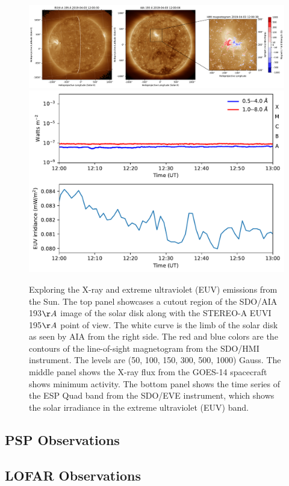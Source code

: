 \begin{figure}[ht]
\centering
\includegraphics[width=\hsize]{figs/ch2/aia_sta_cutout.pdf}
\includegraphics[width=12cm]{figs/ch2/xrs_eve.pdf}
\caption{Exploring the X-ray and extreme ultraviolet (EUV) emissions from the Sun. The top panel showcases a cutout region of the SDO/AIA 193$\AA$ image of the solar disk along with the STEREO-A EUVI 195$\AA$ point of view. The white curve is the limb of the solar disk as seen by AIA from the right side. The red and blue colors are the contours of the line-of-sight magnetogram from the SDO/HMI instrument. The levels are (50, 100, 150, 300, 500, 1000) Gauss. The middle panel shows the X-ray flux from the GOES-14 spacecraft shows minimum activity. The bottom panel shows the time series of the ESP Quad band from the SDO/EVE instrument, which shows the solar irradiance in the extreme ultraviolet (EUV) band.}
\label{soldisk_xrs}
\end{figure}

\subsection{PSP Observations}

\subsection{LOFAR Observations}


